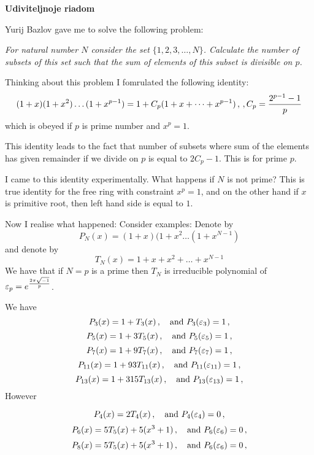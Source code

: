 
 

\baselineskip=14pt
\def\vare {\varepsilon}
\def\t {\tilde}
\def\a {\alpha}
\def\K {{\bf K}}
\def\N {{\bf N}}
\def\C {{\cal C}}
\def\L {{\cal L}}
\def\E {{\cal E}}
\def\s {{\sigma}}
\def\S {{\Sigma}}
\def\p{\partial}
\def\vare{{\varepsilon}}
\def\Q {{\bf Q}}
\def\D {{\cal D}}
\def\G {{\Gamma}}
\def\Z {{\bf Z}}
\def\R  {{\bf R}}
\def\l {\lambda}
\def\ll {{\bf l}}
\def\degree {{\bf {\rm degree}\,\,}}
\def \finish {${\,\,\vrule height1mm depth2mm width 8pt}$}
\def \m {\medskip}
\def\p {\partial}
\def\r {{\bf r}}
\def\pt {{\bf p}}
\def\v {{\bf v}}
\def\n {{\bf n}}
\def\t {{\bf t}}
\def\b {{\bf b}}
\def\c {{\bf c }}
\def\e{{\bf e}}
\def\f{{\bf f}}
\def\ac {{\bf a}}
\def \X   {{\bf X}}
\def \Y   {{\bf Y}}
\def \x   {{\bf x}}
\def \y   {{\bf y}}
\def\w {{\omega}}
\def \Tr  {{\rm Tr\,}}
\def\dim {{\rm dim\,\,}}
\def\t {{\tilde}} 
\def\dist {{\hbox{\tt "distance"}}}


   \centerline {\bf Udiviteljnoje riadom}

Yurij Bazlov gave me to solve the following problem:

{\it     For natural number $N$
consider the set   $\{1,2,3,\dots,N\}$.
Calculate  the number of subsets of this set such that
the sum of elements of this subset is divisible on $p$.

 }

Thinking about this problem I fomrulated  the following identity:
            $$
  (1+x)(1+x^2)\dots(1+x^{p-1})=
    1+C_p(1+x+\dots+x^{p-1})\,, \,, C_p={2^{p-1}-1\over p} 
            $$
which is obeyed if $p$ is prime number and $x^p=1$.


This  identity leads to the fact that
number of subsets where sum  of the elements has given remainder
if we divide on $p$  is equal to  $2C_p-1$.
This is for prime $p$.  

I came to
this identity experimentally.
   What happens if $N$ is not prime?
This is true
identity for the free ring with constraint $x^p=1$, and on
the other hand  if
$x$ is primitive root, then left hand
side is equal to $1$.

    Now I realise what happened:
     Consider examples:
  Denote  by
    $$
     P_N(x)=(1+x)(1+x^2\dots (1+x^{N-1})
   $$
and denote by
       $$
T_N(x)=1+x+x^2+\dots+x^{N-1}
        $$
We have that if $N=p$  is a prime then $T_N$ is irreducible polynomial
of $\vare_p=e^{2\pi\sqrt{-1}\over p}$.


   We have       
 $$ 
P_3(x)=1+T_3(x)\,,\quad \hbox {and $P_3(\vare_3)=1$}\,, 
$$
 $$ 
P_5(x)=1+3T_5(x)\,,\quad \hbox {and $P_5(\vare_5)=1$}\,, 
$$
  \bye
 $$ 
P_7(x)=1+9T_7(x)\,,\quad \hbox {and $P_7(\vare_7)=1$}\,, 
$$
 $$ 
P_{11}(x)=1+93T_{11}(x)\,,\quad \hbox {and $P_{11}(\vare_{11})=1$}\,, 
$$
 $$ 
P_{13}(x)=1+315T_{13}(x)\,,\quad \hbox {and $P_{13}(\vare_{13})=1$}\,, 
$$
However


 $$ 
P_4(x)=2T_4(x)\,,\quad \hbox {and $P_4(\vare_4)=0$}\,, 
$$
 $$ 
P_6(x)=5T_5(x)+5(x^3+1)\,,\quad \hbox {and $P_6(\vare_6)=0$}\,, 
$$
 $$ 
P_8(x)=5T_5(x)+5(x^3+1)\,,\quad \hbox {and $P_6(\vare_6)=0$}\,, 
$$

\bye
